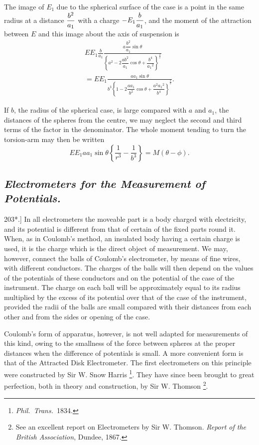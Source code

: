 \documentclass[12pt,oneside]{book}[2021/10/04]
\let\oldfootnote\footnote
\renewcommand\footnote[1]{%
\oldfootnote{\hspace{0.14em}#1}}
\newcommand{\Heading}{\centering\normalfont}
\newcommand{\Subsection}[1]{\subsection*{\normalsize\Heading\itshape #1}}
\newcommand{\article}[1]{\phantomsection \label{art:#1}{#1.]}}
\newcommand{\xp}{\rule[-2.0ex]{0pt}{5.2ex}}
\newcommand{\¬}{\hphantom{0}}
\begin{document}
The image of \(E_1\) due to the spherical surface of the case is a point
in the same radius at a distance \(\xp\dfrac{b^2}{a_1}\) with a charge \(-E_1 \xp\dfrac{b}{a_1}\), and the
moment of the attraction between \(E\) and this image about the axis
of suspension is
\begin{gather*}
EE_1 \frac{b}{a_1} \frac{a \dfrac{b^2}{a_1} \sin \theta} {\left\{ a^2 - 2 \dfrac{ab^2}{a_1} \cos \theta + \dfrac{b^4}{{a_1}^2} \right\}^\frac{3}{2}}\\
= EE_1 \frac{aa_1\sin\theta}{b^3 \left\{ 1 - 2 \dfrac{aa_1}{b^2} \cos \theta + \dfrac{a^2{a_1}^2}{b^4} \right\}^\frac{3}{2}}.
\end{gather*}

If \(b\), the radius of the spherical case, is large compared with \(a\)
and \(a_1\), the distances of the spheres from the centre, we may neglect
the second and third terms of the factor in the denominator. The
whole moment tending to turn the torsion-arm may then be written
\[
EE_1 aa_1\sin\theta\left\{\frac{1}{r^3}-\frac{1}{b^3}\right\}=M(\theta-\phi)\text{.}
\]

\Subsection{Electrometers for the Measurement of Potentials.}

\article{203*} In all electrometers the moveable part is a body charged
with electricity, and its potential is different from that of certain
of the fixed parts round it. When, as in Coulomb's method, an
insulated body having a certain charge is used, it is the charge
which is the direct object of measurement. We may, however,
connect the balls of Coulomb's electrometer, by means of fine wires,
with different conductors. The charges of the balls will then
depend on the values of the potentials of these conductors and on
the potential of the case of the instrument. The charge on each
ball will be approximately equal to its radius multiplied by the
excess of its potential over that of the case of the instrument,
provided the radii of the balls are small compared with their
distances from each other and from the sides or opening of the
case.

Coulomb's form of apparatus, however, is not well adapted for
measurements of this kind, owing to the smallness of the force
between spheres at the proper distances when the difference of
potentials is small. A more convenient form is that of the
Attracted Disk Electrometer. The first electrometers on this
principle were constructed by Sir W. Snow Harris\footnote{
\textit{Phil.\ Trans.}\ 1834.}. They have
since been brought to great perfection, both in theory and construction,
by Sir W. Thomson\footnote{
See an excellent report on Electrometers by Sir W. Thomson. \textit{Report of the
British Association}, Dundee, 1867.}.
\end{document}
